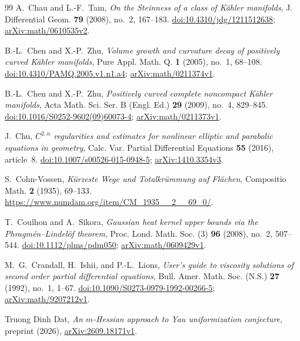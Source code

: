 \documentclass[11pt]{article}
\theoremstyle{definition}
\theoremstyle{remark}
\numberwithin{equation}{section}
\begin{document}
\begin{thebibliography}{99}
A.~Chau and L.-F.~Tam,
\emph{On the Steinness of a class of K\"ahler manifolds},
J. Differential Geom. \textbf{79} (2008), no.~2, 167--183.
\href{https://doi.org/10.4310/jdg/1211512638}
{doi:10.4310/jdg/1211512638};
\href{https://arxiv.org/abs/math/0610535v2}{arXiv:math/0610535v2}.

B.-L.~Chen and X.-P.~Zhu,
\emph{Volume growth and curvature decay of positively curved
K\"ahler manifolds},
Pure Appl. Math. Q. \textbf{1} (2005), no.~1, 68--108.
\href{https://doi.org/10.4310/PAMQ.2005.v1.n1.a4}
{doi:10.4310/PAMQ.2005.v1.n1.a4};
\href{https://arxiv.org/abs/math/0211374v1}{arXiv:math/0211374v1}.

B.-L.~Chen and X.-P.~Zhu,
\emph{Positively curved complete noncompact K\"ahler manifolds},
Acta Math. Sci. Ser. B (Engl. Ed.) \textbf{29} (2009), no.~4, 829--845.
\href{https://doi.org/10.1016/S0252-9602(09)60073-4}
{doi:10.1016/S0252-9602(09)60073-4};
\href{https://arxiv.org/abs/math/0211373v1}{arXiv:math/0211373v1}.

J.~Chu,
\emph{$C^{2,\alpha}$ regularities and estimates for nonlinear elliptic
and parabolic equations in geometry},
Calc. Var. Partial Differential Equations \textbf{55} (2016), article~8.
\href{https://doi.org/10.1007/s00526-015-0948-5}
{doi:10.1007/s00526-015-0948-5};
\href{https://arxiv.org/abs/1410.3354v3}{arXiv:1410.3354v3}.

S.~Cohn-Vossen,
\emph{K\"urzeste Wege und Totalkr\"ummung auf Fl\"achen},
Compositio Math. \textbf{2} (1935), 69--133.
\url{https://www.numdam.org/item/CM_1935__2__69_0/}.

T.~Coulhon and A.~Sikora,
\emph{Gaussian heat kernel upper bounds via the
Phragm\'en--Lindel\"of theorem},
Proc. Lond. Math. Soc. (3) \textbf{96} (2008), no.~2, 507--544.
\href{https://doi.org/10.1112/plms/pdm050}{doi:10.1112/plms/pdm050};
\href{https://arxiv.org/abs/math/0609429v1}{arXiv:math/0609429v1}.

M.~G.~Crandall, H.~Ishii, and P.-L.~Lions,
\emph{User's guide to viscosity solutions of second order partial
differential equations},
Bull. Amer. Math. Soc. (N.S.) \textbf{27} (1992), no.~1, 1--67.
\href{https://doi.org/10.1090/S0273-0979-1992-00266-5}
{doi:10.1090/S0273-0979-1992-00266-5};
\href{https://arxiv.org/abs/math/9207212v1}{arXiv:math/9207212v1}.

Truong Dinh Dat,
\emph{An $m$-Hessian approach to Yau uniformization conjecture},
preprint (2026),
\href{https://arxiv.org/abs/2609.18171v1}{arXiv:2609.18171v1}.


\end{thebibliography}
\end{document}
